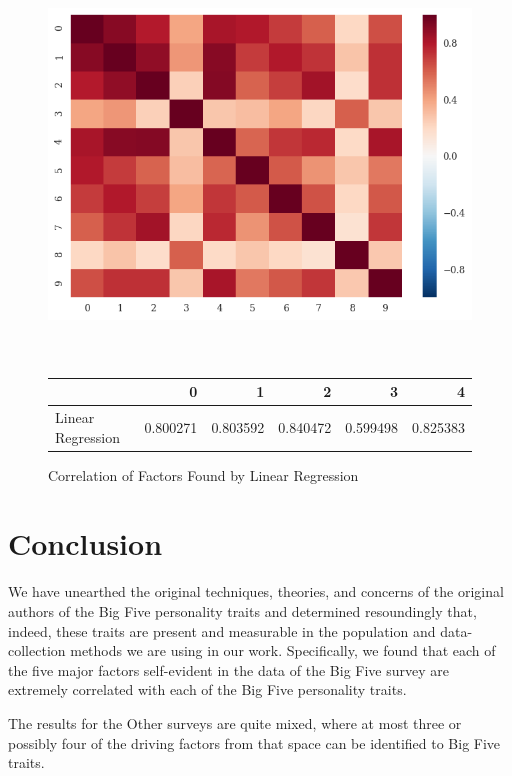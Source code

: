 \documentclass[a4paper,12pt]{article}
\begin{document}
\begin{figure}
\includegraphics[width=\linewidth]{images/linear_reg.png}
\\
\\
\\
\begin{tabular}{lrrrrr}
\toprule
{} &         0 &         1 &         2 &         3 &         4 \\
\midrule
Linear Regression &  0.800271 &  0.803592 &  0.840472 &  0.599498 &  0.825383 \\
\bottomrule
\end{tabular}
\caption{Correlation of Factors Found by Linear Regression}\label{fig:regression}
\end{figure}

\section{Conclusion}

We have unearthed the original techniques, theories, and concerns of the original authors of the Big Five personality traits and determined resoundingly that, indeed, these traits are present and measurable in the population and data-collection methods we are using in our work. Specifically, we found that each of the five major factors self-evident in the data of the Big Five survey are extremely correlated with each of the Big Five personality traits.

The results for the Other surveys are quite mixed, where at most three or possibly four of the driving factors from that space can be identified to Big Five traits.
\end{document}
